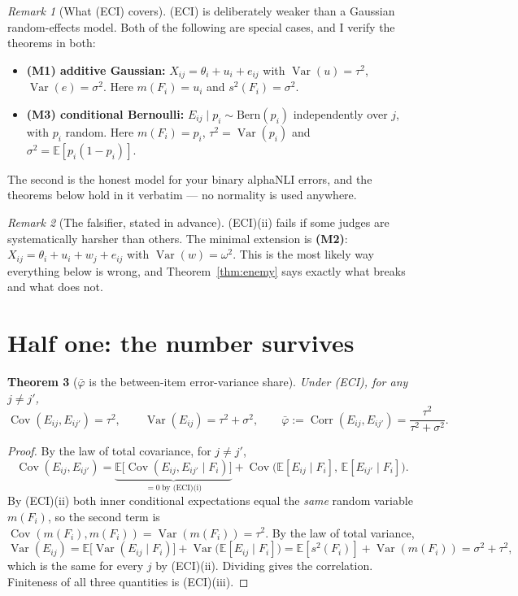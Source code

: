 \documentclass[11pt]{article}
\theoremstyle{plain}
\newtheorem{theorem}{Theorem}
\theoremstyle{definition}
\theoremstyle{remark}
\newtheorem{remark}[theorem]{Remark}
\newcommand{\Var}{\operatorname{Var}}
\newcommand{\Cov}{\operatorname{Cov}}
\newcommand{\Corr}{\operatorname{Corr}}
\newcommand{\E}{\mathbb{E}}
\newcommand{\pb}{\bar{\varphi}}
\begin{document}
\begin{remark}[What (ECI) covers]
(ECI) is deliberately weaker than a Gaussian random-effects model. Both of the following are
special cases, and I verify the theorems in both:
\begin{itemize}
\item \textbf{(M1) additive Gaussian:} $X_{ij}=\theta_i+u_i+e_{ij}$ with
$\Var(u)=\tau^2$, $\Var(e)=\sigma^2$. Here $m(F_i)=u_i$ and $s^2(F_i)=\sigma^2$.
\item \textbf{(M3) conditional Bernoulli:} $E_{ij}\mid p_i \sim \mathrm{Bern}(p_i)$
independently over $j$, with $p_i$ random. Here $m(F_i)=p_i$, $\tau^2=\Var(p_i)$ and
$\sigma^2=\E[p_i(1-p_i)]$.
\end{itemize}
The second is the honest model for your binary alphaNLI errors, and the theorems below hold in
it verbatim --- no normality is used anywhere.
\end{remark}

\begin{remark}[The falsifier, stated in advance]\label{rem:falsifier}
(ECI)(ii) fails if some judges are systematically harsher than others. The minimal extension is
\textbf{(M2)}: $X_{ij}=\theta_i+u_i+w_j+e_{ij}$ with $\Var(w)=\omega^2$. This is the most likely
way everything below is wrong, and Theorem~\ref{thm:enemy} says exactly what breaks and what
does not.
\end{remark}

\section{Half one: the number survives}

\begin{theorem}[$\pb$ is the between-item error-variance share]\label{thm:prop1}
Under \textup{(ECI)}, for any $j\neq j'$,
\[
\Cov(E_{ij},E_{ij'})=\tau^2,\qquad \Var(E_{ij})=\tau^2+\sigma^2,\qquad
\pb:=\Corr(E_{ij},E_{ij'})=\frac{\tau^2}{\tau^2+\sigma^2}.
\]
\end{theorem}

\begin{proof}
By the law of total covariance, for $j\neq j'$,
\[
\Cov(E_{ij},E_{ij'})
=\underbrace{\E\big[\Cov(E_{ij},E_{ij'}\mid F_i)\big]}_{=0\ \text{by (ECI)(i)}}
+\Cov\big(\E[E_{ij}\mid F_i],\,\E[E_{ij'}\mid F_i]\big).
\]
By (ECI)(ii) both inner conditional expectations equal the \emph{same} random variable $m(F_i)$,
so the second term is $\Cov(m(F_i),m(F_i))=\Var(m(F_i))=\tau^2$. By the law of total variance,
\[
\Var(E_{ij})=\E\big[\Var(E_{ij}\mid F_i)\big]+\Var\big(\E[E_{ij}\mid F_i]\big)
=\E[s^2(F_i)]+\Var(m(F_i))=\sigma^2+\tau^2 ,
\]
which is the same for every $j$ by (ECI)(ii). Dividing gives the correlation. Finiteness of all
three quantities is (ECI)(iii).
\end{proof}
\end{document}
